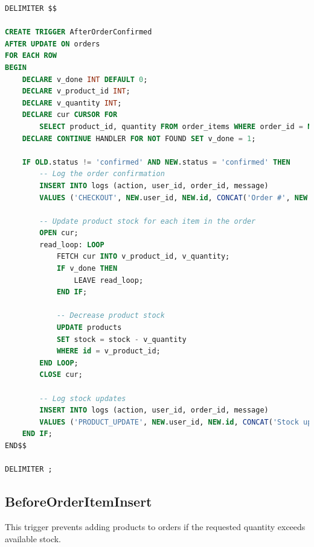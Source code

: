 \documentclass[14pt,a4paper]{article}
\begin{document}
\begin{lstlisting}[language=SQL, caption={AfterOrderConfirmed Trigger}, label={lst:after-order-confirmed}]
DELIMITER $$

CREATE TRIGGER AfterOrderConfirmed
AFTER UPDATE ON orders
FOR EACH ROW
BEGIN
    DECLARE v_done INT DEFAULT 0;
    DECLARE v_product_id INT;
    DECLARE v_quantity INT;
    DECLARE cur CURSOR FOR 
        SELECT product_id, quantity FROM order_items WHERE order_id = NEW.id;
    DECLARE CONTINUE HANDLER FOR NOT FOUND SET v_done = 1;

    IF OLD.status != 'confirmed' AND NEW.status = 'confirmed' THEN
        -- Log the order confirmation
        INSERT INTO logs (action, user_id, order_id, message)
        VALUES ('CHECKOUT', NEW.user_id, NEW.id, CONCAT('Order #', NEW.id, ' confirmed'));

        -- Update product stock for each item in the order
        OPEN cur;
        read_loop: LOOP
            FETCH cur INTO v_product_id, v_quantity;
            IF v_done THEN
                LEAVE read_loop;
            END IF;
            
            -- Decrease product stock
            UPDATE products
            SET stock = stock - v_quantity
            WHERE id = v_product_id;
        END LOOP;
        CLOSE cur;
        
        -- Log stock updates
        INSERT INTO logs (action, user_id, order_id, message)
        VALUES ('PRODUCT_UPDATE', NEW.user_id, NEW.id, CONCAT('Stock updated for order #', NEW.id));
    END IF;
END$$

DELIMITER ;
\end{lstlisting}

\subsection{BeforeOrderItemInsert}

This trigger prevents adding products to orders if the requested quantity exceeds available stock.
\end{document}
